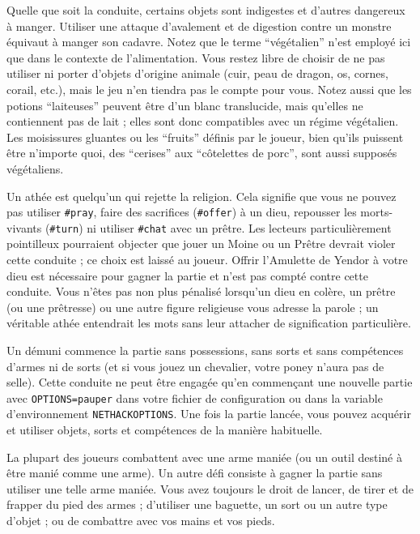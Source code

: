 \documentclass[titlepage]{article}
\begin{document}
Quelle que soit la conduite, certains objets sont indigestes
et d'autres dangereux à manger.  Utiliser une attaque d'avalement et de
digestion contre un monstre équivaut à manger son cadavre.
Notez que le terme ``végétalien'' n'est employé ici que dans le contexte de
l'alimentation.  Vous restez libre de choisir de ne pas utiliser ni porter d'objets d'origine
animale (cuir, peau de dragon, os, cornes, corail, etc.), mais le
jeu n'en tiendra pas le compte pour vous.  Notez aussi que les potions ``laiteuses''
peuvent être d'un blanc translucide, mais qu'elles ne contiennent pas de lait ;
elles sont donc compatibles avec un régime végétalien.  Les moisissures gluantes ou
les ``fruits'' définis par le joueur, bien qu'ils puissent être n'importe quoi,
des ``cerises'' aux ``côtelettes de porc'', sont aussi supposés végétaliens.

Un athée est quelqu'un qui rejette la religion.  Cela signifie que vous ne pouvez pas
utiliser \texttt{\#pray}, faire des sacrifices (\texttt{\#offer}) à un dieu,
repousser les morts-vivants (\texttt{\#turn}) ni utiliser \texttt{\#chat} avec un prêtre.
Les lecteurs particulièrement pointilleux pourraient objecter que jouer un Moine ou
un Prêtre devrait violer cette conduite ; ce choix est laissé au
joueur.  Offrir l'Amulette de Yendor à votre dieu est nécessaire pour
gagner la partie et n'est pas compté contre cette conduite.  Vous n'êtes pas non
plus pénalisé lorsqu'un dieu en colère, un prêtre (ou une prêtresse) ou une
autre figure religieuse vous adresse la parole ; un véritable athée entendrait les
mots sans leur attacher de signification particulière.

Un démuni commence la partie sans possessions, sans sorts et sans compétences
d'armes ni de sorts (et si vous jouez un chevalier, votre poney n'aura pas de selle).
Cette conduite ne peut être engagée qu'en commençant une nouvelle partie avec \texttt{OPTIONS=pauper}
dans votre fichier de configuration ou dans la variable d'environnement \texttt{NETHACKOPTIONS}.
Une fois la partie lancée, vous pouvez acquérir et utiliser objets, sorts et
compétences de la manière habituelle.

La plupart des joueurs combattent avec une arme maniée (ou un outil destiné à être
manié comme une arme).  Un autre défi consiste à gagner la partie sans
utiliser une telle arme maniée.  Vous avez toujours le droit de lancer,
de tirer et de frapper du pied des armes ; d'utiliser une baguette, un sort ou un autre
type d'objet ; ou de combattre avec vos mains et vos pieds.
\end{document}
